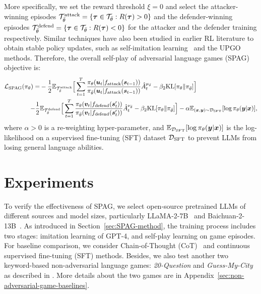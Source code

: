 \documentclass{article}
\theoremstyle{plain}
\theoremstyle{definition}
\theoremstyle{remark}
\begin{document}
More specifically, we set the reward threshold $\xi = 0$ and select the attacker-winning episodes ${\mathcal{T}}^\text{attack}_{\bar{\theta}} = \{\bm{\tau}\in {\mathcal{T}}_{\bar{\theta}}: R(\bm{\tau}) > 0\}$ and the defender-winning episodes ${\mathcal{T}}^\text{defend}_{\bar{\theta}} = \{\bm{\tau}\in {\mathcal{T}}_{\bar{\theta}}: R(\bm{\tau}) < 0\}$ for the attacker and the defender training respectively. Similar techniques have also been studied in earlier RL literature to obtain stable policy updates, such as self-imitation learning~\citep{oh2018self} and the UPGO~\citep{vinyals2019grandmaster} methods. Therefore, the overall self-play of adversarial language games (SPAG) objective is:
\begin{align}
    {\mathcal{L}}_\text{SPAG}(\pi_\theta) =& - \frac{1}{2}{\mathbb{E}}_{{\mathcal{T}}_{\bar{\theta}}^\text{attack}} \Big[\sum_{t=1}^T \frac{\pi_\theta({\bm{u}}_t|f_\text{attack}({\bm{s}}_{t-1}))}{\pi_{\bar{\theta}}({\bm{u}}_t|f_\text{attack}({\bm{s}}_{t-1}))} \hat{A}^{\mu_{\bar{\theta}}}_t -  \beta_2 \text{KL}[\pi_\theta \Vert \pi_{\bar{\theta}}] \Big] \\ -  \frac{1}{2} & {\mathbb{E}}_{{\mathcal{T}}_{\bar{\theta}}^\text{defend}} \Big[\sum_{t=1}^T \frac{\pi_\theta({\bm{v}}_t|f_\text{defend}({\bm{s}}'_{t}))}{\pi_{\bar{\theta}}({\bm{v}}_t|f_\text{defend}({\bm{s}}'_{t}))} \hat{A}^{\nu_{\bar{\theta}}}_t -  \beta_2 \text{KL}[\pi_\theta \Vert \pi_{\bar{\theta}}] \Big] - \alpha  {\mathbb{E}}_{({\bm{x}},{\bm{y}}) \sim {\mathcal{D}}_\text{SFT}}[\log \pi_\theta({\bm{y}}|{\bm{x}})], \nonumber
\end{align}
where $\alpha>0$ is a re-weighting hyper-parameter, and ${\mathbb{E}}_{{\mathcal{D}}_\text{SFT}}[\log \pi_\theta({\bm{y}}|{\bm{x}})]$ is the log-likelihood on a supervised fine-tuning (SFT) dataset ${\mathcal{D}}_\text{SFT}$ to prevent LLMs from losing general language abilities.



\vspace{-2.5mm}
\section{Experiments}
\vspace{-2.5mm}

To verify the effectiveness of SPAG, we select open-source pretrained LLMs of different sources and model sizes, particularly LLaMA-2-7B~\citep{touvron2023llama} and Baichuan-2-13B~\citep{yang2023baichuan}. 
As introduced in Section~\ref{sec:SPAG-method}, the training process includes two stages: imitation learning of GPT-4, and self-play learning on game episodes. For baseline comparison, we consider Chain-of-Thought (CoT)~\citep{wei2022chain} and continuous supervised fine-tuning (SFT) methods. Besides, we also test another two keyword-based non-adversarial language games: \textit{20-Question} and \textit{Guess-My-City} as described in \citet{abdulhai2023lmrl}. More details about the two games are in Appendix~\ref{sec:non-adversarial-game-baselines}.
\end{document}
